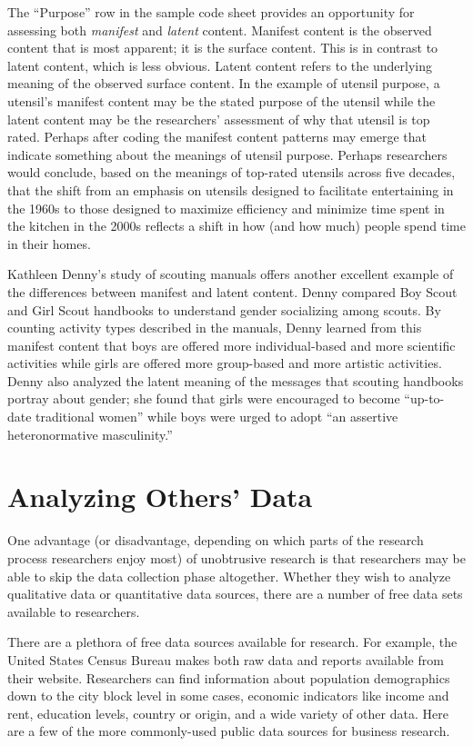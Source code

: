 The ``Purpose'' row in the sample code sheet provides an opportunity for assessing both \textit{manifest} and \textit{latent} content. Manifest content is the observed content that is most apparent; it is the surface content. This is in contrast to latent content, which is less obvious. Latent content refers to the underlying meaning of the observed surface content. In the example of utensil purpose, a utensil's manifest content may be the stated purpose of the utensil while the latent content may be the researchers' assessment of why that utensil is top rated. Perhaps after coding the manifest content patterns may emerge that indicate something about the meanings of utensil purpose. Perhaps researchers would conclude, based on the meanings of top-rated utensils across five decades, that the shift from an emphasis on utensils designed to facilitate entertaining in the 1960s to those designed to maximize efficiency and minimize time spent in the kitchen in the 2000s reflects a shift in how (and how much) people spend time in their homes.

Kathleen Denny's\cite{denny2011gender} study of scouting manuals offers another excellent example of the differences between manifest and latent content. Denny compared Boy Scout and Girl Scout handbooks to understand gender socializing among scouts. By counting activity types described in the manuals, Denny learned from this manifest content that boys are offered more individual-based and more scientific activities while girls are offered more group-based and more artistic activities. Denny also analyzed the latent meaning of the messages that scouting handbooks portray about gender; she found that girls were encouraged to become ``up-to-date traditional women'' while boys were urged to adopt ``an assertive heteronormative masculinity.''

\section{Analyzing Others' Data}

One advantage (or disadvantage, depending on which parts of the research process researchers enjoy most) of unobtrusive research is that researchers may be able to skip the data collection phase altogether. Whether they wish to analyze qualitative data or quantitative data sources, there are a number of free data sets available to researchers.

There are a plethora of free data sources available for research. For example, the United States Census Bureau makes both raw data and reports available from their website. Researchers can find information about population demographics down to the city block level in some cases, economic indicators like income and rent, education levels, country or origin, and a wide variety of other data. Here are a few of the more commonly-used public data sources for business research.

